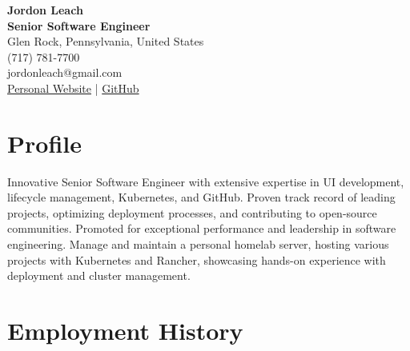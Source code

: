 \documentclass[a4paper,10pt]{article}
\begin{document}
\begin{center}
    \textbf{\Huge Jordon Leach} \\
    \vspace{2mm}
    \textbf{Senior Software Engineer} \\
    \vspace{2mm}
    Glen Rock, Pennsylvania, United States \\
    (717) 781-7700 \\
    jordonleach@gmail.com \\
    \href{https://jordonleach.dev}{Personal Website} | \href{https://github.com/jordojordo}{GitHub} \\
\end{center}

\vspace{5mm}

\section*{Profile}
Innovative Senior Software Engineer with extensive expertise in UI development, lifecycle management, Kubernetes, and GitHub. Proven track record of leading projects, optimizing deployment processes, and contributing to open-source communities. Promoted for exceptional performance and leadership in software engineering. Manage and maintain a personal homelab server, hosting various projects with Kubernetes and Rancher, showcasing hands-on experience with deployment and cluster management.

\section*{Employment History}
\end{document}
